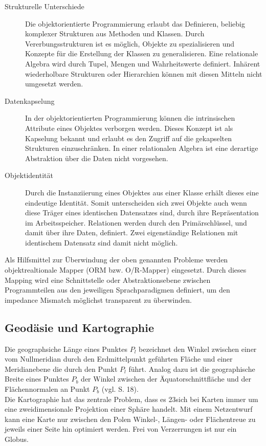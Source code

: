 \begin{description}
 \item [Strukturelle Unterschiede]  
 Die objektorientierte Programmierung erlaubt das Definieren, beliebig komplexer Strukturen aus Methoden und Klassen. Durch Vererbungsstrukturen ist es möglich, Objekte zu spezialisieren und Konzepte für die Erstellung der Klassen zu generalisieren. Eine relationale Algebra wird durch Tupel, Mengen und Wahrheitswerte definiert. Inhärent wiederholbare Strukturen oder Hierarchien können mit diesen Mitteln nicht umgesetzt werden.   
 
 \item [Datenkapselung] 
 In der objektorientierten Programmierung können die intrinsischen Attribute eines Objektes verborgen werden. Dieses Konzept ist als Kapselung bekannt und erlaubt es den Zugriff auf die gekapselten Strukturen einzuschränken. In einer relationalen Algebra ist eine derartige Abstraktion über die Daten nicht vorgesehen.
 
 
 \item [Objektidentität]  
 Durch die Instanziierung eines Objektes aus einer Klasse erhält dieses eine eindeutige Identität. Somit unterscheiden sich zwei Objekte auch wenn diese Träger eines identischen Datensatzes sind, durch ihre Repräsentation im Arbeitsspeicher. Relationen werden durch den Primärschlüssel, und damit über ihre Daten, definiert. Zwei eigenständige Relationen mit identischem Datensatz sind damit nicht möglich.
\end{description}


Als Hilfsmittel zur Überwindung der oben genannten Probleme werden objektrealtionale Mapper (ORM bzw. O/R-Mapper) eingesetzt. Durch dieses Mapping wird eine Schnittstelle oder Abstraktionsebene zwischen Programmteilen aus den jeweiligen Sprachparadigmen definiert, um den impedance Mismatch möglichst transparent zu überwinden.




    

\subsection{Geodäsie und Kartographie}


Die geographsiche Länge eines Punktes $P_l$ bezeichnet den Winkel zwischen einer vom Nullmeridian durch den Erdmittelpunkt geführten Fläche und einer Meridianebene die durch den Punkt $P_l$ führt.
Analog dazu ist die geographische Breite eines Punktes $P_b$ der Winkel zwischen der Äquatorschnittfläche und der Flächennormalen an Punkt $P_b$ (vgl.  \cite{witte2011vermessungskunde} S. 18). 
\\
Die Kartographie hat das zentrale Problem, dass es 23sich bei Karten immer um eine zweidimensionale Projektion einer Sphäre handelt. Mit einem Netzentwurf kann eine Karte nur zwischen den Polen Winkel-, Längen- oder Flächentreue zu jeweils einer Seite hin optimiert werden. Frei von Verzerrungen ist nur ein Globus.

